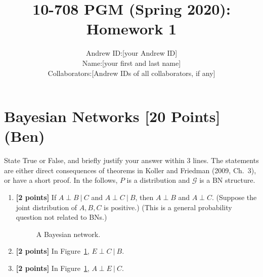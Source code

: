 \documentclass{article}
\title{10-708 PGM (Spring 2020): Homework 1
}
\author{
\begin{tabular}{rl}
Andrew ID: & [your Andrew ID] \\
Name: & [your first and last name] \\
Collaborators: & [Andrew IDs of all collaborators, if any]
\end{tabular}
}
\date{}
\newcommand{\Gcal}{\mathcal{G}}
\begin{document}
\maketitle



\section{Bayesian Networks [20 Points] (Ben)}

State True or False, and briefly justify your answer within 3 lines. 
The statements are either direct consequences of theorems in Koller and Friedman (2009, Ch.~3), or have a short proof.
In the follows, $P$ is a distribution and $\Gcal$ is a BN structure. 


\begin{enumerate}

\item \textbf{[2 points]} If $ A \perp B \ | \ C $ and $ A \perp C \ | \ B $, then $ A \perp B $ and $ A \perp C $. 
(Suppose the joint distribution of $ A, B, C $ is positive.)
(This is a general probability question not related to BNs.)










\begin{figure}[h]
\centering
{}
\caption{A Bayesian network.}
\label{fig:y-bayesnet}
\end{figure}

\item \textbf{[2 points]} In Figure~\ref{fig:y-bayesnet}, $ E \perp C \ | \ B $.






\item \textbf{[2 points]} In Figure~\ref{fig:y-bayesnet}, $ A \perp E \ | \ C $.










\end{enumerate}
\end{document}
